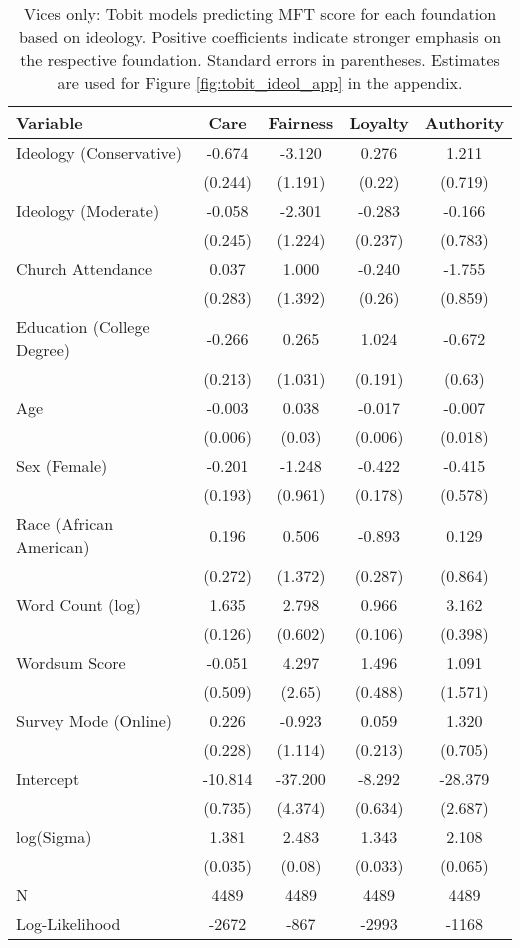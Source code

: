 \begin{table}[ht]
\centering
\caption[Vices only: Tobit models predicting MFT score for each foundation based 
           on ideology]{Vices only: Tobit models predicting MFT score for each foundation based 
           on ideology. Positive coefficients indicate stronger emphasis on the respective 
           foundation. Standard errors in parentheses. Estimates are used for 
           Figure \ref{fig:tobit_ideol_app} in the appendix.} 
\label{tab:tobit_vice}
\begingroup\footnotesize
\begin{tabular}{lcccc}
  \hline
Variable & Care & Fairness & Loyalty & Authority \\ 
  \hline
Ideology (Conservative) &  -0.674 &  -3.120 &  0.276 &   1.211 \\ 
   & (0.244) & (1.191) & (0.22) & (0.719) \\ 
  Ideology (Moderate) &  -0.058 &  -2.301 & -0.283 &  -0.166 \\ 
   & (0.245) & (1.224) & (0.237) & (0.783) \\ 
  Church Attendance &   0.037 &   1.000 & -0.240 &  -1.755 \\ 
   & (0.283) & (1.392) & (0.26) & (0.859) \\ 
  Education (College Degree) &  -0.266 &   0.265 &  1.024 &  -0.672 \\ 
   & (0.213) & (1.031) & (0.191) & (0.63) \\ 
  Age &  -0.003 &   0.038 & -0.017 &  -0.007 \\ 
   & (0.006) & (0.03) & (0.006) & (0.018) \\ 
  Sex (Female) &  -0.201 &  -1.248 & -0.422 &  -0.415 \\ 
   & (0.193) & (0.961) & (0.178) & (0.578) \\ 
  Race (African American) &   0.196 &   0.506 & -0.893 &   0.129 \\ 
   & (0.272) & (1.372) & (0.287) & (0.864) \\ 
  Word Count (log) &   1.635 &   2.798 &  0.966 &   3.162 \\ 
   & (0.126) & (0.602) & (0.106) & (0.398) \\ 
  Wordsum Score &  -0.051 &   4.297 &  1.496 &   1.091 \\ 
   & (0.509) & (2.65) & (0.488) & (1.571) \\ 
  Survey Mode (Online) &   0.226 &  -0.923 &  0.059 &   1.320 \\ 
   & (0.228) & (1.114) & (0.213) & (0.705) \\ 
  Intercept & -10.814 & -37.200 & -8.292 & -28.379 \\ 
   & (0.735) & (4.374) & (0.634) & (2.687) \\ 
  log(Sigma) &   1.381 &   2.483 &  1.343 &   2.108 \\ 
   & (0.035) & (0.08) & (0.033) & (0.065) \\ 
   \hline
N & 4489 & 4489 & 4489 & 4489 \\ 
  Log-Likelihood & -2672 & -867 & -2993 & -1168 \\ 
   \hline
\end{tabular}
\endgroup
\end{table}
